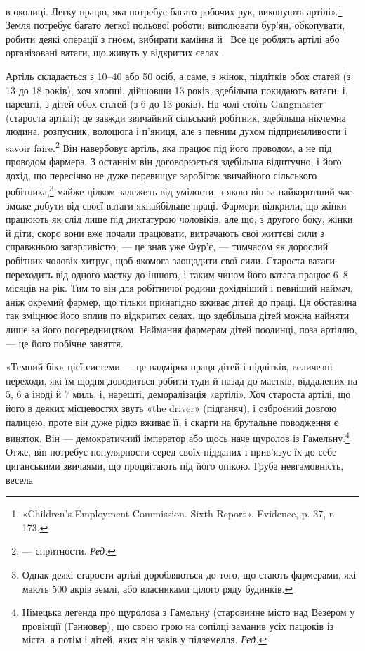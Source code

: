 \parcont{}  %
в околиці. Легку працю, яка потребує багато робочих рук, виконують
артілі».\footnote{
«Children's Employment Commission. Sixth Report». Evidence,
p. 37, n. 173.
} Земля потребує багато легкої польової роботи:
виполювати бур’ян, обкопувати, робити деякі операції з
гноєм, вибирати каміння й~ Все це роблять артілі або організовані
ватаги, що живуть у відкритих селах.

Артіль складається з 10--40 або 50 осіб, а саме, з жінок,
підлітків обох статей (з 13 до 18 років), хоч хлопці, дійшовши
13 років, здебільша покидають ватаги, і, нарешті, з дітей обох
статей (з 6 до 13 років). На чолі стоїть Gangmaster (староста
артілі); це завжди звичайний сільський робітник, здебільша
нікчемна людина, розпусник, волоцюга і п’яниця, але з певним
духом підприємливости і savoir faire.\footnote*{
— спритности. \emph{Ред.}
} Він навербовує артіль,
яка працює під його проводом, а не під проводом фармера. З останнім
він договорюється здебільша відштучно, і його дохід, що
пересічно не дуже перевищує заробіток звичайного сільського
робітника,\footnote{
Однак деякі старости артілі доробляються до того, що стають
фармерами, які мають 500 акрів землі, або власниками цілого ряду будинків.
} майже цілком залежить від умілости, з якою він
за найкоротший час зможе добути від своєї ватаги якнайбільше
праці. Фармери відкрили, що жінки працюють як слід лише під
диктатурою чоловіків, але що, з другого боку, жінки й діти,
скоро вони вже почали працювати, витрачають свої життєві
сили з справжньою загарливістю, — це знав уже Фур’є, — тимчасом
як дорослий робітник-чоловік хитрує, щоб якомога заощадити
свої сили. Староста ватаги переходить від одного маєтку
до іншого, і таким чином його ватага працює 6--8 місяців на
рік. Тим то він для робітничої родини дохідніший і певніший
наймач, аніж окремий фармер, що тільки принагідно вживає
дітей до праці. Ця обставина так зміцнює його вплив по відкритих
селах, що здебільша дітей можна найняти лише за його посередництвом.
Наймання фармерам дітей поодинці, поза артіллю, —
це його побічне заняття.

«Темний бік» цієї системи — це надмірна праця дітей і підлітків,
величезні переходи, які їм щодня доводиться робити туди
й назад до маєтків, віддалених на 5, 6 а іноді й 7 миль, і, нарешті,
деморалізація «артілі». Хоч староста артілі, що його в деяких
місцевостях звуть «the driver» (підганяч), і озброєний довгою
палицею, проте він дуже рідко вживає її, і скарги на брутальне
поводження є виняток. Він — демократичний імператор або щось
наче щуролов із Гамельну.\footnote*{
Німецька легенда про щуролова з Гамельну (старовинне місто
над Везером у провінції (Ганновер), що своєю грою на сопілці заманив
усіх пацюків із міста, а потім і дітей, яких він завів у підземелля. \emph{Ред.}
} Отже, він потребує популярности
серед своїх підданих і прив’язує їх до себе циганськими звичаями,
що процвітають під його опікою. Груба невгамовність, весела
\parbreak{}  %
